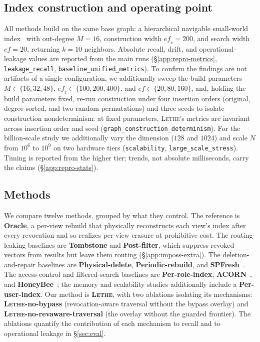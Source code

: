 \documentclass[sigconf, nonacm, review]{acmart}
\begin{document}
\subsection{Index construction and operating point}
\label{app:repro-build}
All methods build on the same base graph: a hierarchical navigable small-world
index~\cite{DBLP:journals/pami/MalkovY20} with out-degree $M=16$, construction
width $\mathit{ef_{c}}=200$, and search width $\mathit{ef}=20$, returning
$k=10$ neighbors. Absolute recall, drift, and operational-leakage values are
reported from the main runs (\S\ref{app:repro-metrics},
\texttt{leakage\_recall}, \texttt{baseline\_unified\_metrics}). To confirm the
findings are not artifacts of a single configuration, we additionally sweep the
build parameters $M\in\{16,32,48\}$, $\mathit{ef_{c}}\in\{100,200,400\}$, and
$\mathit{ef}\in\{20,80,160\}$, and, holding the build parameters fixed, re-run
construction under four insertion orders (original, degree-sorted, and two
random permutations) and three seeds to isolate construction nondeterminism:
at fixed parameters, \textsc{Lethe}'s metrics are invariant across insertion
order and seed (\texttt{graph\_construction\_determinism}). For the billion-scale
study we additionally vary the dimension ($128$ and $1024$) and scale $N$ from
$10^{6}$ to $10^{9}$ on two hardware tiers (\texttt{scalability},
\texttt{large\_scale\_stress}). Timing is reported from the higher tier;
trends, not absolute milliseconds, carry the claims (\S\ref{app:repro-stats}).

\subsection{Methods}
\label{app:repro-methods}
We compare twelve methods, grouped by what they control. The reference is
\textbf{Oracle}, a per-view rebuild that physically reconstructs each view's
index after every revocation and so realizes per-view erasure at prohibitive
cost. The routing-leaking baselines are \textbf{Tombstone} and
\textbf{Post-filter}, which suppress revoked vectors from results but leave them
routing (\S\ref{app:imposs-extra}). The deletion-and-repair baselines are
\textbf{Physical-delete}, \textbf{Periodic-rebuild}, and
\textbf{SPFresh}~\cite{DBLP:conf/sosp/XuLLXCZLYYYCY23}. The access-control and
filtered-search baselines are \textbf{Per-role-index},
\textbf{ACORN}~\cite{DBLP:journals/pacmmod/PatelKGZ24}, and
\textbf{HoneyBee}~\cite{DBLP:journals/corr/abs-2505-01538}; the memory and
scalability studies additionally include a \textbf{Per-user-index}. Our method
is \textbf{\textsc{Lethe}}, with two ablations isolating its mechanisms:
\textbf{\textsc{Lethe}-no-bypass} (revocation-aware traversal without the bypass
overlay) and \textbf{\textsc{Lethe}-no-revaware-traversal} (the overlay without
the guarded frontier). The ablations quantify the contribution of each
mechanism to recall and to operational leakage in \S\ref{sec:eval}.
\end{document}
